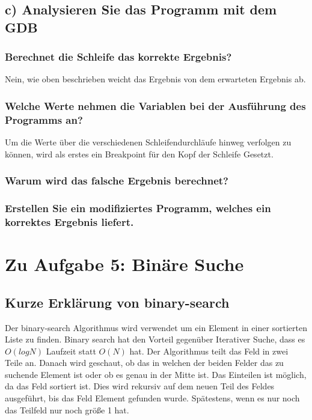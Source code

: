 \documentclass[12pt]{article}
\begin{document}
\subsection{c) Analysieren Sie das Programm mit dem GDB }

\subsubsection{Berechnet die Schleife das korrekte Ergebnis?}
Nein, wie oben beschrieben weicht das Ergebnis von dem erwarteten Ergebnis ab.

\subsubsection{Welche Werte nehmen die Variablen bei der Ausführung des Programms an?}
Um die Werte über die verschiedenen Schleifendurchläufe hinweg verfolgen zu können, wird als erstes ein Breakpoint für den Kopf der Schleife Gesetzt.


\subsubsection{Warum wird das falsche Ergebnis berechnet?}

\subsubsection{Erstellen Sie ein modifiziertes Programm, welches ein korrektes Ergebnis liefert.}


\newpage
\section{Zu Aufgabe 5: Binäre Suche}

\subsection{Kurze Erklärung von binary-search}

Der binary-search Algorithmus wird verwendet um ein Element in einer sortierten Liste zu finden.
Binary search hat den Vorteil gegenüber Iterativer Suche, dass es $O(log N)$ Laufzeit statt $O(N)$ hat.
Der Algorithmus teilt das Feld in zwei Teile an. Danach wird geschaut, ob das in welchen der beiden Felder das zu suchende
Element ist oder ob es genau in der Mitte ist. Das Einteilen ist möglich, da das Feld sortiert ist. 
Dies wird rekursiv auf dem neuen Teil des Feldes ausgeführt, bis das Feld Element gefunden wurde. 
Spätestens, wenn es nur noch das Teilfeld nur noch größe 1 hat.
\end{document}
